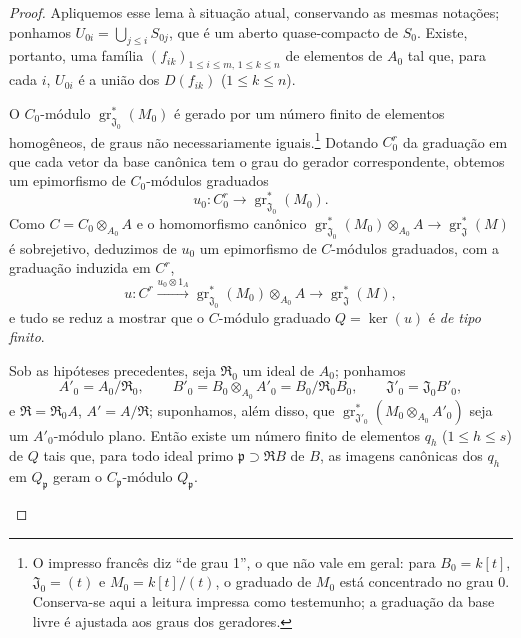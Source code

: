 \begin{proof}
Apliquemos esse lema à situação atual, conservando as mesmas notações; ponhamos $U_{0i}=\bigcup_{j\leq i}S_{0j}$, que é um aberto quase-compacto de $S_0$. Existe, portanto, uma família $(f_{ik})_{1\leq i\leq m,\,1\leq k\leq n}$ de elementos de $A_0$ tal que, para cada $i$, $U_{0i}$ é a união dos $D(f_{ik})$ ($1\leq k\leq n$).


O $C_0$-módulo $\operatorname{gr}_{\mathfrak J_0}^*(M_0)$ é gerado por um número finito de elementos homogêneos, de graus não necessariamente iguais.\footnote{O impresso francês diz “de grau 1”, o que não vale em geral: para $B_0=k[t]$, $\mathfrak J_0=(t)$ e $M_0=k[t]/(t)$, o graduado de $M_0$ está concentrado no grau $0$. Conserva-se aqui a leitura impressa como testemunho; a graduação da base livre é ajustada aos graus dos geradores.} Dotando $C_0^r$ da graduação em que cada vetor da base canônica tem o grau do gerador correspondente, obtemos um epimorfismo de $C_0$-módulos graduados
\[
u_0:C_0^r\longrightarrow\operatorname{gr}_{\mathfrak J_0}^*(M_0).
\]
Como $C=C_0\otimes_{A_0}A$ e o homomorfismo canônico $\operatorname{gr}_{\mathfrak J_0}^*(M_0)\otimes_{A_0}A\to\operatorname{gr}_{\mathfrak J}^*(M)$ é sobrejetivo, deduzimos de $u_0$ um epimorfismo de $C$-módulos graduados, com a graduação induzida em $C^r$,
\[
u:C^r\xrightarrow{u_0\otimes1_A}
\operatorname{gr}_{\mathfrak J_0}^*(M_0)\otimes_{A_0}A
\longrightarrow\operatorname{gr}_{\mathfrak J}^*(M),
\]
e tudo se reduz a mostrar que o $C$-módulo graduado $Q=\ker(u)$ é \emph{de tipo finito}.

\begin{lemma}[11.2.9.6]
\label{IV.11.2.9.6}
Sob as hipóteses precedentes, seja $\mathfrak R_0$ um ideal de $A_0$; ponhamos
\[
A'_0=A_0/\mathfrak R_0,\qquad
B'_0=B_0\otimes_{A_0}A'_0=B_0/\mathfrak R_0B_0,\qquad
\mathfrak J'_0=\mathfrak J_0B'_0,
\]
e $\mathfrak R=\mathfrak R_0A$, $A'=A/\mathfrak R$; suponhamos, além disso, que $\operatorname{gr}_{\mathfrak J'_0}^*(M_0\otimes_{A_0}A'_0)$ seja um $A'_0$-módulo plano. Então existe um número finito de elementos $q_h$ ($1\leq h\leq s$) de $Q$ tais que, para todo ideal primo $\mathfrak p\supset\mathfrak RB$ de $B$, as imagens canônicas dos $q_h$ em $Q_{\mathfrak p}$ geram o $C_{\mathfrak p}$-módulo $Q_{\mathfrak p}$.
\end{lemma}


\end{proof}
